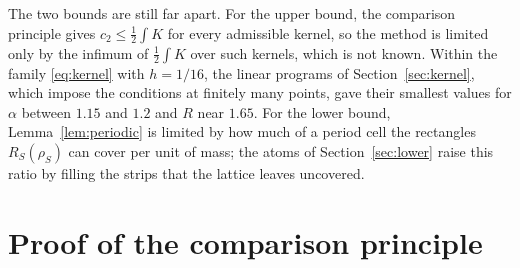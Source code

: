 \documentclass[11pt]{amsart}
\theoremstyle{definition}
\theoremstyle{remark}
\numberwithin{equation}{section}
\begin{document}
The two bounds are still far apart. For the upper bound, the comparison principle gives $c_2\le\frac12\int K$ for every admissible kernel, so the method is limited only by the infimum of $\frac12\int K$ over such kernels, which is not known. Within the family \eqref{eq:kernel} with $h=1/16$, the linear programs of Section~\ref{sec:kernel}, which impose the conditions at finitely many points, gave their smallest values for $\alpha$ between $1.15$ and $1.2$ and $R$ near $1.65$. For the lower bound, Lemma~\ref{lem:periodic} is limited by how much of a period cell the rectangles $R_S(\rho_S)$ can cover per unit of mass; the atoms of Section~\ref{sec:lower} raise this ratio by filling the strips that the lattice leaves uncovered.

\appendix
\section{Proof of the comparison principle}\label{app:principle}
\end{document}
